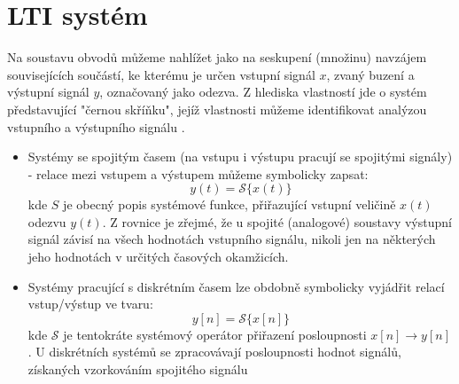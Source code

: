 \setchaptertoc
\chapter{LTI systém}\label{tky:IchII}
    Na soustavu obvodů můžeme nahlížet jako na seskupení (množinu) navzájem souvisejících součástí, 
    ke kterému je určen vstupní signál $x$, zvaný buzení a výstupní signál $y$, označovaný jako 
    odezva. Z hlediska vlastností jde o systém představující "černou skříňku", jejíž vlastnosti 
    můžeme identifikovat analýzou vstupního a výstupního signálu \cite{Bicak2007}.        

    \begin{itemize}
      \item Systémy se spojitým časem (na vstupu i výstupu pracují se spojitými signály) - relace  
            mezi vstupem a výstupem můžeme symbolicky zapsat:
            \begin{equation}\label{tky:eq005}
              y(t)=\mathcal{S}\{x(t)\}
            \end{equation}
            kde $S$ je obecný popis systémové funkce, přiřazující vstupní veličině $x(t)$ odezvu 
            $y(t)$. Z rovnice je zřejmé, že u spojité (analogové) soustavy výstupní signál závisí 
            na všech hodnotách vstupního signálu, nikoli jen na některých jeho hodnotách v určitých 
            časových okamžicích.
      \item Systémy pracující s diskrétním časem lze obdobně symbolicky vyjádřit relací  
            vstup/výstup ve tvaru:
            \begin{equation}\label{tky:eq022}
              y[n]=\mathcal{S}\{x[n]\}
            \end{equation}
            kde $\mathcal{S}$ je tentokráte systémový operátor přiřazení posloupnosti 
            $x[n]\rightarrow y[n]$. U diskrétních systémů se zpracovávají posloupnosti hodnot 
            signálů, získaných vzorkováním spojitého signálu
    \end{itemize}
    
